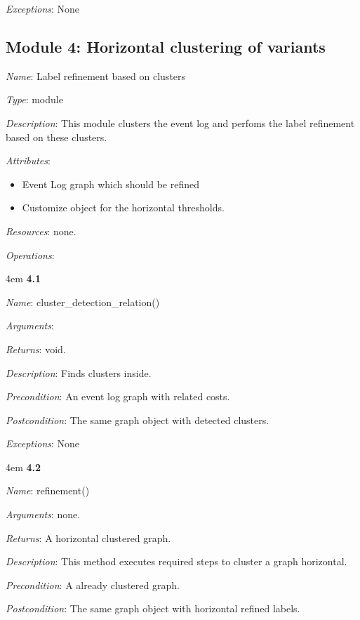 \documentclass[notitlepage]{article}
\begin{document}
\begin{flushleft}
\textit{Exceptions}: None
\par
\endgroup


\subsection{Module 4: Horizontal clustering of variants}
\textit{Name}: Label refinement based on clusters

\textit{Type}: module

\textit{Description}: This module clusters the event log and perfoms the label refinement based on these clusters.

\textit{Attributes}: \begin{itemize}
	\item Event Log graph which should be refined 
	\item Customize object for the horizontal thresholds.
\end{itemize}

\textit{Resources}: none.

\textit{Operations}: 
\medskip

\par
\begingroup
\leftskip4em
\textbf{4.1} 

\textit{Name}: cluster\_detection\_relation()

\textit{Arguments}:  

\textit{Returns}: void.

\textit{Description}: Finds clusters inside.

\textit{Precondition}: An event log graph with related costs.

\textit{Postcondition}: The same graph object with detected clusters.

\textit{Exceptions}: None
\par
\endgroup

\medskip

\par
\begingroup
\leftskip4em
\textbf{4.2} 

\textit{Name}: refinement()

\textit{Arguments}: none.

\textit{Returns}: A horizontal clustered graph.

\textit{Description}: This method executes required steps to cluster a graph horizontal.

\textit{Precondition}: A already clustered graph.

\textit{Postcondition}: The same graph object with horizontal refined labels.


\end{flushleft}
\end{document}
